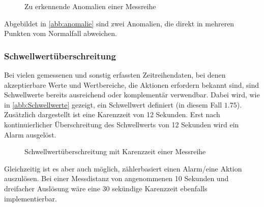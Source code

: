 \begin{figure}[H]
\centering
{}
\caption{Zu erkennende Anomalien einer Messreihe}
\label{abb:anomalie}
\end{figure}

Abgebildet in \autoref{abb:anomalie} sind zwei Anomalien, die direkt in mehreren Punkten vom Normalfall abweichen.
\subsubsection{Schwellwertüberschreitung}\label{chap:schwellwert}
Bei vielen gemessenen und sonstig erfassten Zeitreihendaten, bei denen akzeptierbare Werte und Wertbereiche, die Aktionen erfordern bekannt sind, sind Schwellwerte bereits ausreichend oder komplementär verwendbar. Dabei wird, wie in \autoref{abb:Schwellwerte} gezeigt, ein Schwellwert definiert (in diesem Fall $1.75$). Zusätzlich dargestellt ist eine Karenzzeit von 12 Sekunden. Erst nach kontinuierlicher Überschreitung des Schwellwerts von 12 Sekunden wird ein Alarm ausgelöst. 
\begin{figure}[H]
\centering
{}
\caption{Schwellwertüberschreitung mit Karenzzeit einer Messreihe}
\label{abb:Schwellwerte}
\end{figure}
Gleichzeitig ist es aber auch möglich, zählerbasiert einen Alarm/eine Aktion auszulösen. Bei einer Messdistanz von angenommenen 10 Sekunden und dreifacher Auslösung wäre eine 30 sekündige Karenzzeit ebenfalls implementierbar.

